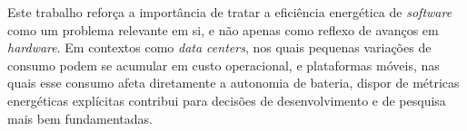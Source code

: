 Este trabalho reforça a importância de tratar a
eficiência energética de \textit{software} como um problema relevante em si,
e não apenas como reflexo de avanços em \textit{hardware}. Em contextos como
\textit{data centers}, nos quais pequenas variações de consumo podem se
acumular em custo operacional, e plataformas móveis, nas quais esse consumo
afeta diretamente a autonomia de bateria, dispor de métricas energéticas
explícitas contribui para decisões de desenvolvimento e de pesquisa mais bem
fundamentadas.